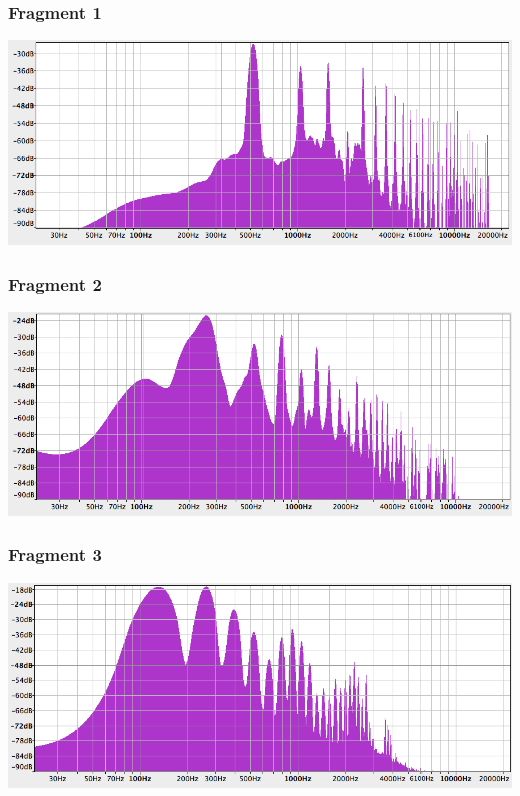 \documentclass[compress, darktitle, framenumber, totalframenumber]{beamer}
\begin{document}
\begin{frame}
\frametitle{Fragment 1}
\includegraphics[width=\textwidth]{images2/Exercise-sample1.png}
\end{frame}

\begin{frame}
\frametitle{Fragment 2}
\includegraphics[width=\textwidth]{images2/Exercise-sample2.png}
\end{frame}

\begin{frame}
\frametitle{Fragment 3}
\includegraphics[width=\textwidth]{images2/Exercise-sample3.png}
\end{frame}
\end{document}
